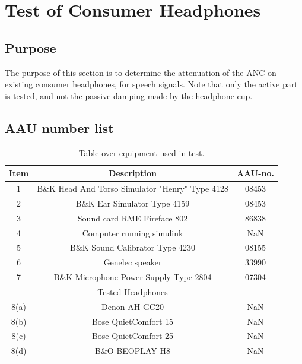 
\section{Test of Consumer Headphones}
\subsection{Purpose}
The purpose of this section is to determine the attenuation of the ANC on existing consumer headphones, for speech signals. 
Note that only the active part is tested, and not the passive damping made by the headphone cup.


\subsection{AAU number list}
\begin{table}[H]
	\centering
	\begin{tabular}{ c c c } \toprule
	{Item}	&	{Description} 								& {AAU-no}. \\ 
								\bottomrule 
		1	&	B\&K Head And Torso Simulator "Henry" Type 4128	& 08453	\\
		2	&	B\&K Ear Simulator Type 4159				& 08453		\\
		3	&	Sound card RME Fireface 802					& 86838		\\
		4	&	Computer running simulink					& NaN		\\
		5	&	B\&K Sound Calibrator Type 4230				& 08155		\\ 
		6	&	Genelec speaker								& 33990		\\ 
		7	& 	B\&K Microphone Power Supply Type 2804		& 07304		\\
								\bottomrule
							& Tested Headphones 			& 			\\
								\bottomrule
		8(a)	& Denon AH GC20 								& NaN 		\\
		8(b)	& Bose QuietComfort 15 							& NaN 		\\
		8(c)	& Bose QuietComfort 25						 	& NaN		\\
		8(d)	& B\&O BEOPLAY H8 								& NaN		\\
								\bottomrule
	\end{tabular}
	\caption{Table over equipment used in test.}
	\label{tab:UsedEquipmentListConsumerHP}
\end{table}

